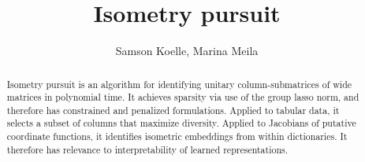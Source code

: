\documentclass[a4paper,11pt]{article}
\begin{document}
\title{Isometry pursuit}
\author{Samson Koelle, Marina Meila}

\maketitle

\begin{abstract}

Isometry pursuit is an algorithm for identifying unitary column-submatrices of wide matrices in polynomial time. %
It achieves sparsity via use of the group lasso norm, and therefore has constrained and penalized formulations.
Applied to tabular data, it selects a subset of columns that maximize diversity.
Applied to Jacobians of putative coordinate functions, it identifies isometric embeddings from within dictionaries.
It therefore has relevance to interpretability of learned representations.

\end{abstract}






\end{document}
